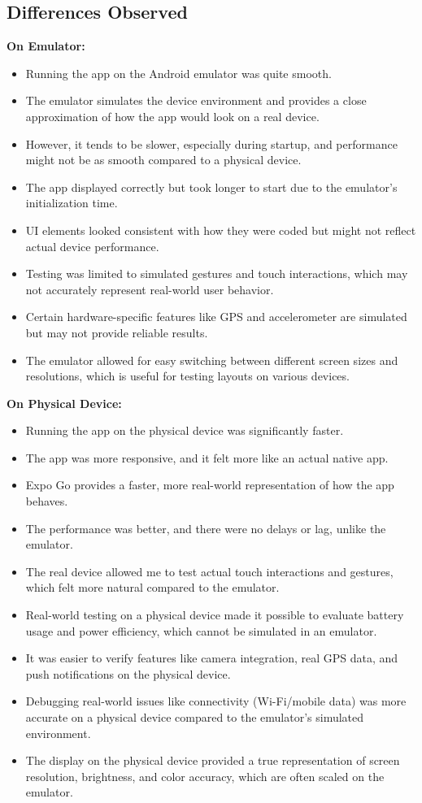 \documentclass[12pt]{article}
\begin{document}
\subsection*{Differences Observed}
\textbf{On Emulator:}
\begin{itemize}
    \item Running the app on the Android emulator was quite smooth.
    \item The emulator simulates the device environment and provides a close approximation of how the app would look on a real device.
    \item However, it tends to be slower, especially during startup, and performance might not be as smooth compared to a physical device.
    \item The app displayed correctly but took longer to start due to the emulator’s initialization time.
    \item UI elements looked consistent with how they were coded but might not reflect actual device performance.
    \item Testing was limited to simulated gestures and touch interactions, which may not accurately represent real-world user behavior.
    \item Certain hardware-specific features like GPS and accelerometer are simulated but may not provide reliable results.
    \item The emulator allowed for easy switching between different screen sizes and resolutions, which is useful for testing layouts on various devices.
\end{itemize}
\textbf{On Physical Device:}
\begin{itemize}
    \item Running the app on the physical device was significantly faster.
    \item The app was more responsive, and it felt more like an actual native app.
    \item Expo Go provides a faster, more real-world representation of how the app behaves.
    \item The performance was better, and there were no delays or lag, unlike the emulator.
    \item The real device allowed me to test actual touch interactions and gestures, which felt more natural compared to the emulator.
    \item Real-world testing on a physical device made it possible to evaluate battery usage and power efficiency, which cannot be simulated in an emulator.
    \item It was easier to verify features like camera integration, real GPS data, and push notifications on the physical device.
    \item Debugging real-world issues like connectivity (Wi-Fi/mobile data) was more accurate on a physical device compared to the emulator’s simulated environment.
    \item The display on the physical device provided a true representation of screen resolution, brightness, and color accuracy, which are often scaled on the emulator.
\end{itemize}
\end{document}
